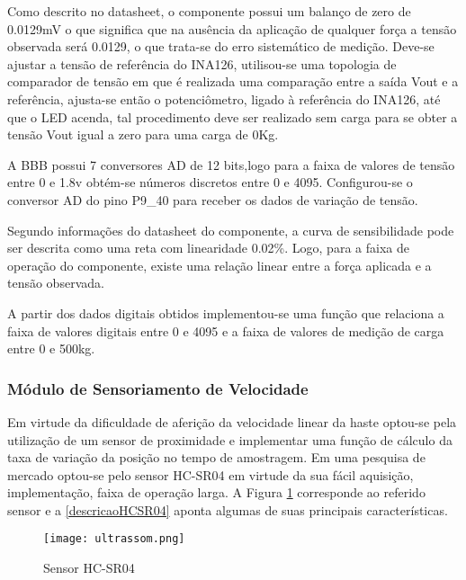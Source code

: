 		Como descrito no datasheet, o componente possui um balanço de zero de 0.0129mV o que significa que na ausência da aplicação de qualquer força a tensão observada será 0.0129, o que trata-se do erro sistemático de medição. Deve-se ajustar a tensão de referência do INA126, utilisou-se uma topologia de comparador de tensão em que é realizada uma comparação entre a saída Vout e a referência, ajusta-se então o potenciômetro, ligado à referência do INA126, até que o LED acenda, tal procedimento deve ser realizado sem carga para se obter a tensão Vout igual a zero para uma carga de 0Kg.

		A BBB possui 7 conversores AD de 12 bits,logo para a faixa de valores de tensão entre 0 e 1.8v obtém-se números discretos entre 0 e 4095. Configurou-se o conversor AD do pino P9\_40 para receber os dados de variação de tensão.

		Segundo informações do datasheet do componente, a curva de sensibilidade pode ser descrita como uma reta com linearidade 0.02\%. Logo, para a faixa de operação do componente, existe uma relação linear entre a força aplicada e a tensão observada. 

		A partir dos dados digitais obtidos implementou-se uma função que relaciona a faixa de valores digitais entre 0 e 4095 e a faixa de valores de medição de carga entre 0 e 500kg.  


	\subsubsection{Módulo de Sensoriamento de Velocidade}

		Em virtude da dificuldade de aferição da velocidade linear da haste optou-se pela utilização de um sensor de proximidade e implementar uma função de cálculo da taxa de variação da posição no tempo de amostragem. Em uma pesquisa de mercado optou-se pelo sensor HC-SR04 em virtude da sua fácil aquisição, implementação, faixa de operação larga. A Figura \ref{ultrassom} corresponde ao referido sensor e a  \ref{descricaoHCSR04} aponta algumas de suas principais características.
	
		\begin{figure}[!h]
			\centering
			\texttt{[image: ultrassom.png]}
			\caption{Sensor HC-SR04}
			\label{ultrassom}
		\end{figure}

